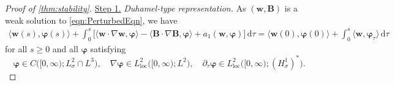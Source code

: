 \documentclass[10pt]{amsart}
\theoremstyle{plain}
\theoremstyle{definition}
\theoremstyle{remark}
\numberwithin{equation}{section}
\newcommand{\bb}{{\boldsymbol{b}}}
\newcommand{\bw}{{\boldsymbol{w}}}
\newcommand{\bB}{{\boldsymbol{B}}}
\newcommand{\vp}{\varphi}
\newcommand{\ve}{\varepsilon}
\begin{document}
\begin{proof}[Proof of \cref{thm:stability}] 

\uline{Step 1.} \emph{Duhamel-type representation.} 
As $(\bw,\bB)$ is a weak solution to \cref{eqn:PerturbedEqn}, we have
\begin{align}\label{eqn:weakformulation1}
\langle \bw(s), \boldsymbol{\varphi}(s)  \rangle
+\int_0^s \Big[ 
\langle \bw\cdot  \nabla \bw, \boldsymbol{\varphi} \rangle
- \langle \bB\cdot  \nabla \bB, \boldsymbol{\varphi} \rangle
+ a_1(\bw,\boldsymbol{\vp})
\Big]\, \mathrm d\tau 
= \langle \bw(0), \boldsymbol{\varphi}(0)  \rangle 
+ \int_0^s \langle \bw, \boldsymbol{\varphi}_\tau \rangle \, \mathrm d\tau
\end{align}
for all $s\geq 0$ and all $\boldsymbol{\varphi}$ satisfying 
\[
\boldsymbol{\varphi} \in C\big( [0, \infty); L^2_\sigma \cap L^3 \big), \quad 
\nabla \boldsymbol{\varphi} \in L^2_{\mathrm{loc}}\big( [0,\infty); L^2 \big), \quad 
\partial_\tau \boldsymbol{\varphi} \in L^2_{\mathrm{loc}}\big( [0,\infty); (H^1_\sigma)^* \big).
\]



\end{proof}
\end{document}
